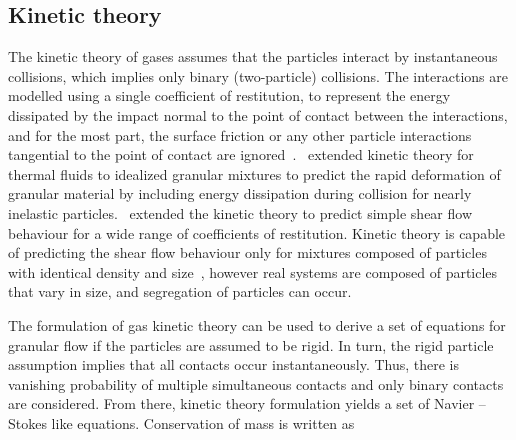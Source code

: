 \subsection{Kinetic theory}
The kinetic theory of gases assumes that the particles interact by 
instantaneous collisions, which implies only binary (two-particle) collisions. 
The interactions 
are modelled using a single coefficient of restitution, to represent the energy 
dissipated by the impact normal to the point of contact between the 
interactions, 
and for the most part, the surface friction or any other particle interactions 
tangential to the point of contact are 
ignored~\citep{Campbell1990}.~\citet{Jenkins1983} extended kinetic theory 
for thermal fluids to idealized granular mixtures to predict the rapid 
deformation of granular material by including energy dissipation during 
collision for nearly inelastic particles.~\citet{Savage1981} extended the 
kinetic theory to predict simple shear flow behaviour for a wide range of 
coefficients of restitution. Kinetic theory is capable of predicting the 
shear flow behaviour only for mixtures composed of particles with identical 
density and size~\citep{Iddir2005}, however real systems are composed of 
particles that vary in size, and segregation of particles can occur. 

The formulation of gas kinetic theory can be used to derive a
set of equations for granular flow if the particles are assumed to
be rigid. In turn, the rigid particle assumption implies that all contacts 
occur instantaneously. Thus, there is vanishing probability of multiple 
simultaneous contacts and only binary contacts are considered. From there, 
kinetic theory formulation yields a set of Navier – Stokes like equations. 
Conservation of mass is written as

